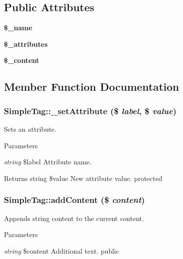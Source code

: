 \subsection*{Public Attributes}
\begin{DoxyCompactItemize}
\item 
\hypertarget{class_simple_tag_a0d4cced3e66eec94d947e469b983e2b8}{
{\bfseries \$\_\-name}}
\label{class_simple_tag_a0d4cced3e66eec94d947e469b983e2b8}

\item 
\hypertarget{class_simple_tag_a6d018439bca77734bd94de2583aca71b}{
{\bfseries \$\_\-attributes}}
\label{class_simple_tag_a6d018439bca77734bd94de2583aca71b}

\item 
\hypertarget{class_simple_tag_ae0bf7dceb35f541b58046dc0f5119e86}{
{\bfseries \$\_\-content}}
\label{class_simple_tag_ae0bf7dceb35f541b58046dc0f5119e86}

\end{DoxyCompactItemize}


\subsection{Member Function Documentation}
\hypertarget{class_simple_tag_a6bb44da8e2c6bca9f43d4130f427eecc}{
\subsubsection[{\_\-setAttribute}]{\setlength{\rightskip}{0pt plus 5cm}SimpleTag::\_\-setAttribute (\$ {\em label}, \/  \$ {\em value})}}
\label{class_simple_tag_a6bb44da8e2c6bca9f43d4130f427eecc}
Sets an attribute. 
\begin{DoxyParams}{Parameters}
\item[{\em string}]\$label Attribute name. \end{DoxyParams}
\begin{DoxyReturn}{Returns}
string \$value New attribute value.  protected 
\end{DoxyReturn}
\hypertarget{class_simple_tag_ae8478a7c35ab3c16e8284667cd5f0bd5}{
\subsubsection[{addContent}]{\setlength{\rightskip}{0pt plus 5cm}SimpleTag::addContent (\$ {\em content})}}
\label{class_simple_tag_ae8478a7c35ab3c16e8284667cd5f0bd5}
Appends string content to the current content. 
\begin{DoxyParams}{Parameters}
\item[{\em string}]\$content Additional text.  public \end{DoxyParams}


